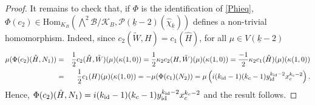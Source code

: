 \documentclass{amsart}
\theoremstyle{definition}
\theoremstyle{remark}
\numberwithin{equation}{section}
\newcommand{\cB}{{\mathcal B}}
\newcommand{\cK}{{\mathcal K}}
\newcommand{\cP}{{\mathcal P}}
\newcommand{\Hom}{{\mathrm {Hom}}}
\begin{document}
\begin{proof}
It remains to check that, if $\Phi$ is the identification of \eqref{Phieq}, $\Phi(c_2)\in\Hom_{K_B}\left(\bigwedge^2\cB/\cK_B,\cP(\underline k-2)(\hat\chi_{\underline k}) \right)$ defines a non-trivial homomorphism. Indeed, since $c_2(\tilde W, H)=c_1(\hat H)$, for all $\mu\in V(\underline k-2)$
\begin{eqnarray*}
\mu(\Phi(c_2)(\hat H,N_1))&=&\frac{1}{2}c_2(\hat H,\tilde W)(\mu)(\kappa(1,0))=\frac{1}{2}\kappa_2 c_2( H,\tilde W)(\mu)(\kappa(1,0))=\frac{-1}{2}\kappa_2 c_1(\hat H)(\mu)(\kappa(1,0))\\
&=&\frac{1}{2}c_1(H)(\mu)(\kappa(1,0))=-\mu(\Phi(c_1)(N_2))=\mu\left(i(k_{\rm id}-1)(k_c-1)y_{\rm id}^{k_{{\rm id}}-2}x_c^{k_c-2}\right).
\end{eqnarray*}
Hence, $\Phi(c_2)(\hat H,N_1)=i(k_{\rm id}-1)(k_c-1)y_{\rm id}^{k_{{\rm id}}-2}x_c^{k_c-2}$ and the result follows.
\end{proof}
\end{document}

